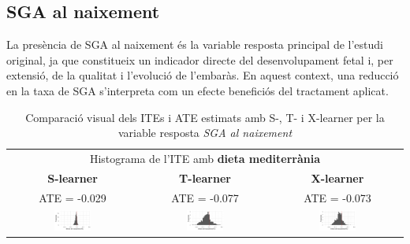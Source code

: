 \documentclass[../main.tex]{subfiles}
\begin{document}
    \subsection{SGA al naixement}\label{subsec:SGAneix}

    La presència de SGA al naixement és la variable resposta principal de l’estudi original, ja que constitueix un indicador directe del desenvolupament fetal i, per extensió, de la qualitat i l’evolució de l’embaràs. En aquest context, una reducció en la taxa de SGA s’interpreta com un efecte beneficiós del tractament aplicat.

    
    \begin{table}[H]
        \centering
        \begin{tabular}{ccc}
        \multicolumn{3}{c}{Histograma de l'ITE amb \textbf{dieta mediterrània}} \\
        \small \textbf{S-learner} & \small \textbf{T-learner} & \small \textbf{X-learner} \\
        \footnotesize ATE = -0.029 & \footnotesize ATE = -0.077 & \footnotesize ATE = -0.073 \\
        \includegraphics[width=0.3\textwidth]{imgs/histogrames/hist(SGA_birth_hard_imput)S_tract2.jpg} &
        \includegraphics[width=0.3\textwidth]{imgs/histogrames/hist(SGA_birth_hard_imput)T_tract2.jpg} &
        \includegraphics[width=0.3\textwidth]{imgs/histogrames/hist(SGA_birth_hard_imput)X_tract2.jpg} \\
        \end{tabular}
        \caption{\footnotesize Comparació visual dels ITEs i ATE estimats amb S-, T- i X-learner per la variable resposta \textit{SGA al naixement}}
        \label{tab:histITE_SGAneix2}
    \end{table}
\end{document}

